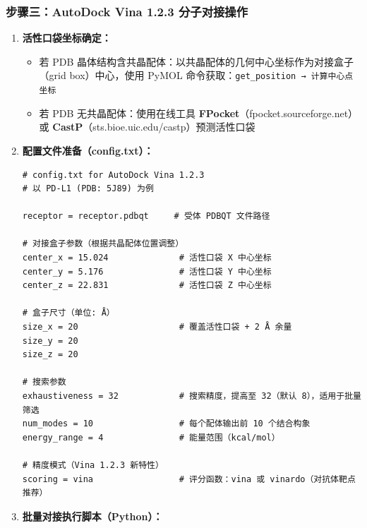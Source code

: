 \documentclass[12pt,a4paper,twoside]{article}
\newcommand{\database}[1]{\textbf{\textsf{#1}}}
\begin{document}
\subsubsection{步骤三：AutoDock Vina 1.2.3 分子对接操作}

\begin{enumerate}
  \item \textbf{活性口袋坐标确定：}
    \begin{itemize}
      \item 若 PDB 晶体结构含共晶配体：以共晶配体的几何中心坐标作为对接盒子（grid box）中心，使用 PyMOL 命令获取：\texttt{get\_position → 计算中心点坐标}
      \item 若 PDB 无共晶配体：使用在线工具 \database{FPocket}（fpocket.sourceforge.net）或 \database{CastP}（sts.bioe.uic.edu/castp）预测活性口袋
    \end{itemize}

  \item \textbf{配置文件准备（config.txt）：}
\begin{lstlisting}[language={},caption={AutoDock Vina 参数配置文件}]
# config.txt for AutoDock Vina 1.2.3
# 以 PD-L1 (PDB: 5J89) 为例

receptor = receptor.pdbqt     # 受体 PDBQT 文件路径

# 对接盒子参数（根据共晶配体位置调整）
center_x = 15.024              # 活性口袋 X 中心坐标
center_y = 5.176               # 活性口袋 Y 中心坐标
center_z = 22.831              # 活性口袋 Z 中心坐标

# 盒子尺寸（单位: Å）
size_x = 20                    # 覆盖活性口袋 + 2 Å 余量
size_y = 20
size_z = 20

# 搜索参数
exhaustiveness = 32            # 搜索精度，提高至 32（默认 8），适用于批量筛选
num_modes = 10                 # 每个配体输出前 10 个结合构象
energy_range = 4               # 能量范围（kcal/mol）

# 精度模式（Vina 1.2.3 新特性）
scoring = vina                 # 评分函数：vina 或 vinardo（对抗体靶点推荐）
\end{lstlisting}

  \item \textbf{批量对接执行脚本（Python）：}
\end{enumerate}
\end{document}
